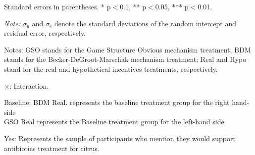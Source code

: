 \documentclass[12pt]{article}
\begin{document}
\begin{table}[H]
\begin{tablenotes}
            \footnotesize
            \item Standard errors in parentheses. * p$<$0.1, ** p$<$0.05, *** p$<$0.01.
            \item \textit{Note:} $\sigma_u$ and $\sigma_e$ denote the standard deviations of the random intercept and residual error, respectively.
            \item Notes: GSO stands for the Game Structure Obvious mechanism treatment; BDM stands for the Becker-DeGroot-Marschak mechanism treatment; Real and Hypo stand for the real and hypothetical incentives treatments, respectively.
           \item $\times$: Interaction.
           \item Baseline: BDM Real. represents the baseline treatment group for the right hand-side \\
           GSO Real represents the Baseline treatment group for the left-hand side.
           \item Yes: Represents the sample of participants who mention they would support antibiotics treatment for citrus.
        \end{tablenotes}
\end{table}

\clearpage
\end{document}

